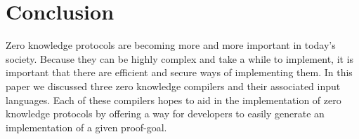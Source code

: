 \documentclass{sig-alternate}
\begin{document}
\begin{comment}
	Almeida et al. describe briefly in~\cite{ZKCrypt:2012} how ZKCrypt can be used to
	generate a proof for proving the identity of the user when withdrawing money from
	a bank account. The user has to prove they have a secret key in order to successfully
	withdraw money. 
	
	The authors state the proof-goal as:
	\begin{align*}
	ZPK\left[(u_{1}, u_{2}): I = g^{u_{1}}_{1}g^{u_{2}}_{2}\right].
	\end{align*}
	In this goal, $I, g_{1}, g_{2} \in \mathbb{Z}^{*}_{p}$ such that ord $g_{1}$ = ord
	$g_{2}$ = $q$, where $q|(p - 1)$ and $p, q \in \mathbb{P}$. The secrets $u_{1}, u_{2}$
	are elements of $\mathbb{Z}_{q}$. A single instance of the $\Sigma^{\Phi}$-protocol
	is enough to realize this goal.
	
	Meiklejohn et al. also give this example, a user proving their identity to the bank,
	implemented in ZKDPL. The program for this looks like: 
	\begin{verbatim}
	proof:
	  given:
	  	group: cashGroup = <f, g, h, h1, h2>
	  	elements in cashGroup: A, pk_u
	  	  commitment to sk_u: A = g^sk_u * h^r_u
	  prove knowledge of:
	  	exponents in cashGroup: sk_u, r_u
	  such that:
	  	pk_u = g^sk_u
	  	A = g^sk_u * h^r_u
	\end{verbatim}
	
	When the bank has verified this proof, the bank and the user will run a protocol
	which defines a wallet which contains $W$ coins, where $W$ is a system-wide
	public parameter. When a user spends a coin, it is split up into two parts: an
	endorsed part and an unendorsed part. Separately the two parts are worthless, but
	together the coin becomes valid. First the unendorsed part is sent to the vendor
	who proves its validity. The vendor then sends what the buyer has purchased. The
	buyer sends the endorsed portion of the coin to the vendor upon receiving their
	product.
	
	\end{comment}

\section{Conclusion}
	Zero knowledge protocols are becoming more and more important in today's society. 
	Because they can be highly complex and take a while to implement, it is important 
	that there are efficient and secure ways of implementing them. In this paper we discussed
	three zero knowledge compilers and their associated input languages. Each of these compilers
	hopes to aid in the implementation of zero knowledge protocols by offering a way for
	developers to easily generate an implementation of a given proof-goal.
	
\end{document}

